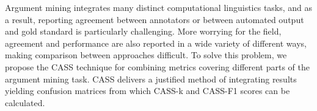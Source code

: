 Argument mining integrates many distinct computational linguistics tasks, and as a result, reporting agreement between annotators or between automated output and gold standard is particularly challenging. More worrying  for the field, agreement and performance are also reported in a wide variety of different ways, making comparison between approaches difficult. To solve this  problem, we propose the CASS technique for combining metrics covering different parts of the argument mining task. CASS delivers a justified method of integrating results yielding confusion  matrices from which CASS-k and CASS-F1  scores can be calculated.
